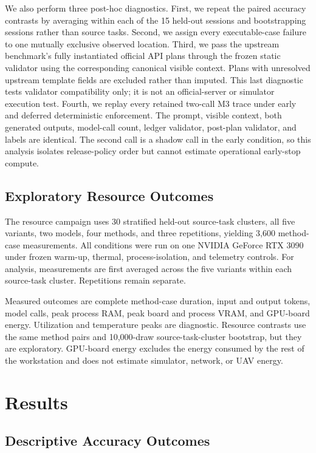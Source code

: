 \documentclass[conference]{IEEEtran}
\newcommand{\Mthree}{\textsc{M3}\xspace}
\begin{document}
We also perform three post-hoc diagnostics. First, we repeat the paired
accuracy contrasts by averaging within each of the 15 held-out sessions and
bootstrapping sessions rather than source tasks. Second, we assign every
executable-case failure to one mutually exclusive observed location. Third, we
pass the upstream benchmark's fully instantiated official API plans through
the frozen static validator using the corresponding canonical visible context.
Plans with unresolved upstream template fields are excluded rather than
imputed. This last diagnostic tests validator compatibility only; it is not an
 official-server or simulator execution test. Fourth, we replay every retained
 two-call \Mthree trace under early and deferred deterministic enforcement. The
 prompt, visible context, both generated outputs, model-call count, ledger
 validator, post-plan validator, and labels are identical. The second call is a
 shadow call in the early condition, so this analysis isolates release-policy
 order but cannot estimate operational early-stop compute.

\subsection{Exploratory Resource Outcomes}

The resource campaign uses 30 stratified held-out source-task clusters, all
five variants, two models, four methods, and three repetitions, yielding 3,600
method-case measurements. All conditions were run on one NVIDIA GeForce RTX
3090 under frozen warm-up, thermal, process-isolation, and telemetry controls.
For analysis, measurements are first averaged across the five variants within
each source-task cluster. Repetitions remain separate.

Measured outcomes are complete method-case duration, input and output tokens,
model calls, peak process RAM, peak board and process VRAM, and GPU-board
energy. Utilization and temperature peaks are diagnostic. Resource contrasts
use the same method pairs and 10,000-draw source-task-cluster bootstrap, but
they are exploratory. GPU-board energy excludes the energy consumed by the
rest of the workstation and does not estimate simulator, network, or UAV
energy.

\section{Results}

\subsection{Descriptive Accuracy Outcomes}
\end{document}
